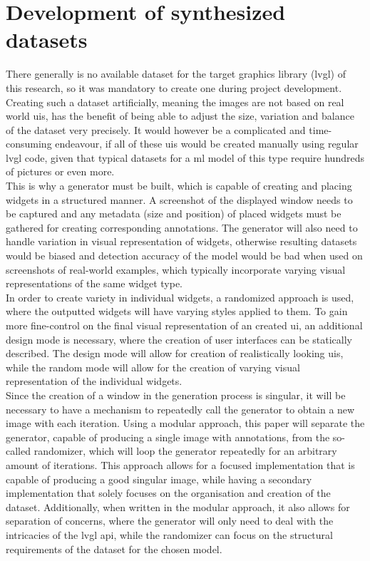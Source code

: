 \documentclass[Bachelor, BIC, english, fhCitStyle, IEEE]{BASE/twbook} %
\begin{document}
\chapter{Development of synthesized datasets}
There generally is no available dataset for the target graphics library (\ac{lvgl}) of this research, so it was mandatory to create one during project development. Creating such a dataset artificially, meaning the images are not based on real world \acp{ui}, has the benefit of being able to adjust the size, variation and balance of the dataset very precisely. It would however be a complicated and time-consuming endeavour, if all of these \aclp{ui} would be created manually using regular \ac{lvgl} code, given that typical datasets for a \ac{ml} model of this type require hundreds of pictures or even more.\\
This is why a generator must be built, which is capable of creating and placing widgets in a structured manner. A screenshot of the displayed window needs to be captured and any metadata (size and position) of placed widgets must be gathered for creating corresponding annotations. The generator will also need to handle variation in visual representation of widgets, otherwise resulting datasets would be biased and detection accuracy of the model would be bad when used on screenshots of real-world examples, which typically incorporate varying visual representations of the same widget type.\\
In order to create variety in individual widgets, a randomized approach is used, where the outputted widgets will have varying styles applied to them. To gain more fine-control on the final visual representation of an created \ac{ui}, an additional design mode is necessary, where the creation of user interfaces can be statically described. The design mode will allow for creation of realistically looking \acp{ui}, while the random mode will allow for the creation of varying visual representation of the individual widgets.\\
Since the creation of a window in the generation process is singular, it will be necessary to have a mechanism to repeatedly call the generator to obtain a new image with each iteration. Using a modular approach, this paper will separate the generator, capable of producing a single image with annotations, from the so-called randomizer, which will loop the generator repeatedly for an arbitrary amount of iterations. This approach allows for a focused implementation that is capable of producing a good singular image, while having a secondary implementation that solely focuses on the organisation and creation of the dataset. Additionally, when written in the modular approach, it also allows for separation of concerns, where the generator will only need to deal with the intricacies of the \ac{lvgl} \ac{api}, while the randomizer can focus on the structural requirements of the dataset for the chosen model.\\
\end{document}
